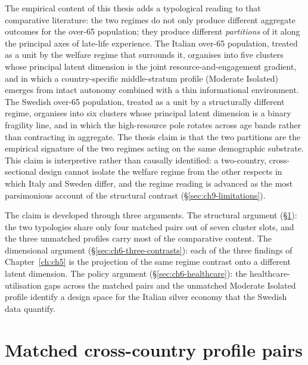 The empirical content of this thesis adds a typological reading to that comparative literature: the two regimes do not only produce different aggregate outcomes for the over-65 population; they produce different \emph{partitions} of it along the principal axes of late-life experience. The Italian over-65 population, treated as a unit by the welfare regime that surrounds it, organises into five clusters whose principal latent dimension is the joint resource-and-engagement gradient, and in which a country-specific middle-stratum profile (Moderate Isolated) emerges from intact autonomy combined with a thin informational environment. The Swedish over-65 population, treated as a unit by a structurally different regime, organises into six clusters whose principal latent dimension is a binary fragility line, and in which the high-resource pole rotates across age bands rather than contracting in aggregate. The thesis claim is that the two partitions are the empirical signature of the two regimes acting on the same demographic substrate. This claim is interpretive rather than causally identified: a two-country, cross-sectional design cannot isolate the welfare regime from the other respects in which Italy and Sweden differ, and the regime reading is advanced as the most parsimonious account of the structural contrast (\S\ref{sec:ch9-limitations}).

The claim is developed through three arguments. The structural argument (\S\ref{sec:ch6-matched-pairs}): the two typologies share only four matched pairs out of seven cluster slots, and the three unmatched profiles carry most of the comparative content. The dimensional argument (\S\ref{sec:ch6-three-contrasts}): each of the three findings of Chapter~\ref{ch:ch5} is the projection of the same regime contrast onto a different latent dimension. The policy argument (\S\ref{sec:ch6-healthcare}): the healthcare-utilisation gaps across the matched pairs and the unmatched Moderate Isolated profile identify a design space for the Italian silver economy that the Swedish data quantify.

\section{Matched cross-country profile pairs}
\label{sec:ch6-matched-pairs}

